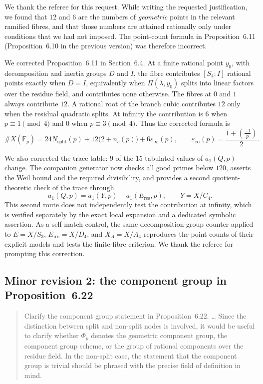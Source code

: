 \documentclass[11pt,letterpaper]{article}
\begin{document}
We thank the referee for this request. While writing the requested justification, we found that \(12\) and \(6\) are the numbers of \emph{geometric} points in the relevant ramified fibres, and that those numbers are attained rationally only under conditions that we had not imposed. The point-count formula in Proposition~6.11 (Proposition~6.10 in the previous version) was therefore incorrect.

We corrected Proposition~6.11 in Section~6.4. At a finite rational point \(y_0\), with decomposition and inertia groups \(D\) and \(I\), the fibre contributes \([S_4:I]\) rational points exactly when \(D=I\), equivalently when \(\Pi(\lambda,y_0)\) splits into linear factors over the residue field, and contributes none otherwise. The fibres at \(0\) and \(1\) always contribute \(12\). A rational root of the branch cubic contributes \(12\) only when the residual quadratic splits. At infinity the contribution is \(6\) when \(p\equiv1\pmod4\) and \(0\) when \(p\equiv3\pmod4\). Thus the corrected formula is
\[
\#X(\mathbb F_p)=24N_{\mathrm{split}}(p)+12\bigl(2+n_c(p)\bigr)+6\varepsilon_\infty(p),
\qquad
\varepsilon_\infty(p)=\frac{1+\left(\frac{-1}{p}\right)}2.
\]

We also corrected the trace table: \(9\) of the \(15\) tabulated values of \(a_1(Q,p)\) change. The companion generator now checks all good primes below \(120\), asserts the Weil bound and the required divisibility, and provides a second quotient-theoretic check of the trace through
\[
a_1(Q,p)=a_1(Y,p)-a_1(E_{\mathrm{res}},p),\qquad Y=X/C_4.
\]
This second route does not independently test the contribution at infinity, which is verified separately by the exact local expansion and a dedicated symbolic assertion. As a self-match control, the same decomposition-group counter applied to \(E=X/S_3\), \(E_{\mathrm{res}}=X/D_4\), and \(X_A=X/A_4\) reproduces the point counts of their explicit models and tests the finite-fibre criterion. We thank the referee for prompting this correction.

\subsection*{Minor revision 2: the component group in Proposition~6.22}

\begin{quote}
Clarify the component group statement in Proposition~6.22. \dots{} Since the distinction between split and non-split nodes is involved, it would be useful to clarify whether \(\Phi_p\) denotes the geometric component group, the component group scheme, or the group of rational components over the residue field. In the non-split case, the statement that the component group is trivial should be phrased with the precise field of definition in mind.
\end{quote}
\end{document}
